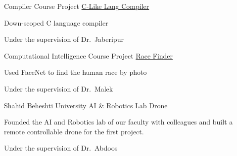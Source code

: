 \begin{cventries}
\cventry
{Compiler Course Project} %
{\href{https://github.com/mory91/c-like}{C-Like Lang Compiler}} %
{} %
{} %
{ %
\begin{cvitems}
\item {Down-scoped C language compiler}
\item {Under the supervision of Dr.~Jaberipur}
\end{cvitems}
}

\cventry
{Computational Intelligence Course Project} %
{\href{https://github.com/mory91/racefinder}{Race Finder}} %
{} %
{} %
{ %
\begin{cvitems}
\item {Used FaceNet to find the human race by photo}
\item {Under the supervision of Dr.~Malek}
\end{cvitems}
}

\cventry
{Shahid Beheshti University AI \& Robotics Lab} %
{Drone} %
{} %
{} %
{ %
\begin{cvitems}
\item {Founded the AI and Robotics lab of our faculty with colleagues and built a remote controllable drone for the first project.}
\item {Under the supervision of Dr.~Abdoos}
\end{cvitems}
}


\end{cventries}